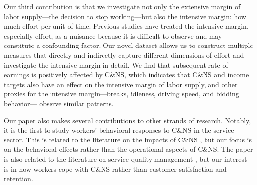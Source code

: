 \documentclass[reviewmode,AEJ]{AEA}
\begin{document}
Our third contribution is that we investigate not only the extensive margin of labor supply---the decision
to stop working---but also the intensive margin: %
how much effort per unit of time. 
Previous studies have treated the intensive margin, especially effort, as a nuisance because it is 
difficult to observe and may constitute a confounding factor. 
Our novel dataset allows us to construct multiple
measures that directly and indirectly capture different dimensions of effort and investigate the intensive
margin in detail. %
We find that subsequent rate of earnings is positively affected by C\&NS, which indicates that C\&NS and income targets also have an effect on the
intensive margin of labor supply, and other proxies for the intensive margin---breaks, idleness, driving speed, and bidding behavior--- observe similar patterns.

Our paper also makes several contributions to other strands of research. Notably, it is the first to study
workers' behavioral responses to C\&NS in the service sector. This is related to the literature on the
impacts of C\&NS \citep{moore2001time,patrick2008reducing}, %
but our focus is on the behavioral effects rather than the operational aspects of C\&NS. 
The paper is also related to the literature on service quality management \citep{cohen2018frustration},
but our interest is in how workers cope with C\&NS rather than customer satisfaction and retention. 

\end{document}
